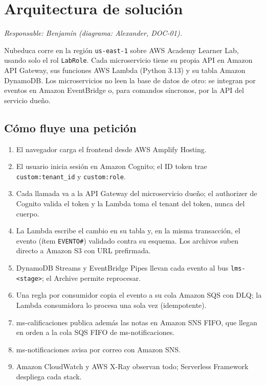 \section{Arquitectura de solución}
\label{sec:arquitectura}
\textit{Responsable: Benjamín (diagrama: Alexander, DOC-01).}

Nubeduca corre en la región \texttt{us-east-1} sobre AWS Academy Learner Lab, usando solo el rol
\texttt{LabRole}. Cada microservicio tiene su propia API en Amazon API Gateway, sus funciones AWS
Lambda (Python 3.13) y su tabla Amazon DynamoDB. Los microservicios no leen la base de datos de otro:
se integran por eventos en Amazon EventBridge o, para comandos síncronos, por la API del servicio
dueño.


\subsection{Cómo fluye una petición}
\begin{enumerate}
  \item El navegador carga el frontend desde AWS Amplify Hosting.
  \item El usuario inicia sesión en Amazon Cognito; el ID token trae \texttt{custom:tenant\_id} y
        \texttt{custom:role}.
  \item Cada llamada va a la API Gateway del microservicio dueño; el authorizer de Cognito valida el
        token y la Lambda toma el tenant del token, nunca del cuerpo.
  \item La Lambda escribe el cambio en su tabla y, en la misma transacción, el evento (ítem
        \texttt{EVENTO\#}) validado contra su esquema. Los archivos suben directo a Amazon S3 con URL
        prefirmada.
  \item DynamoDB Streams y EventBridge Pipes llevan cada evento al bus \texttt{lms-<stage>}; el Archive
        permite reprocesar.
  \item Una regla por consumidor copia el evento a su cola Amazon SQS con DLQ; la Lambda consumidora lo
        procesa una sola vez (idempotente).
  \item ms-calificaciones publica además las notas en Amazon SNS FIFO, que llegan en orden a la cola
        SQS FIFO de ms-notificaciones.
  \item ms-notificaciones avisa por correo con Amazon SNS.
  \item Amazon CloudWatch y AWS X-Ray observan todo; Serverless Framework despliega cada stack.
\end{enumerate}

